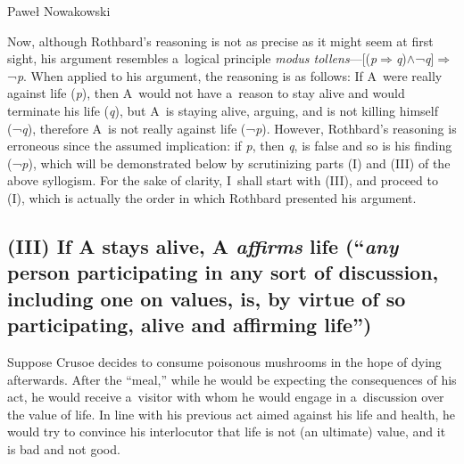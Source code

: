 \begin{artengenv}{Paweł Nowakowski}
\begin{enumerate}[label=(\Roman*), start=4]
\end{enumerate}

Now, although Rothbard's reasoning is not as precise as it might seem at first sight, his argument resembles a~logical principle \textit{modus tollens}---[(\textit{p}$\Rightarrow $\textit{q})${\wedge}$¬\textit{q}]$\Rightarrow $¬\textit{p}. When applied to his argument, the reasoning is as follows: If A~were really against life (\textit{p}), then A~would not have a~reason to stay alive and would terminate his life (\textit{q}), but A~is staying alive, arguing, and is not killing himself (¬\textit{q}), therefore A~is not really against life (¬\textit{p}). However, Rothbard's reasoning is erroneous since the assumed implication: if \textit{p}, then \textit{q}, is false and so is his finding (¬\textit{p}), which will be demonstrated below by scrutinizing parts (I) and (III) of the above syllogism. For the sake of clarity, I~shall start with (III), and proceed to (I), which is actually the order in which Rothbard presented his argument.



%
%
%

\subsection{\textbf{(III) If A stays alive, A \textit{affirms} life} (``\textit{any} person participating in any sort of discussion, including one on values, is, by virtue of so participating, alive and affirming life'')}



Suppose Crusoe decides to consume poisonous mushrooms in the hope of dying afterwards. After the ``meal,'' while he would be expecting the consequences of his act, he would receive a~visitor with whom he would engage in a~discussion over the value of life. In line with his previous act aimed against his life and health, he would try to convince his interlocutor that life is not (an ultimate) value, and it is bad and not good.




\end{artengenv}
